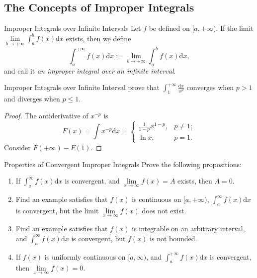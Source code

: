 \subsection{The Concepts of Improper Integrals}

\begin{definition}{Improper Integrals over Infinite Intervals}{}
  Let $f$ be defined on $[a, +\infty)$.
  If the limit $\lim \limits _{b \rightarrow +\infty} \int_a^b f(x)\mathrm{d} x$
  exists,
  then we define
  \begin{equation}
    \int_a^{+\infty} f(x) \mathrm{d} x := \lim \limits _{b \rightarrow +\infty} \int_a^b f(x)\mathrm{d} x,
  \end{equation}
  and call it \emph{an improper integral over an infinite interval}.
\end{definition}

\begin{example}{Improper Integrals over Infinite Interval}{}
  prove that $\int_1^{+\infty} \frac{\mathrm{d}x}{x^p}$ converges when $p > 1$
  and diverges when $p \leq 1$.
\end{example}

\begin{proof}
  The antiderivative of $x^{-p}$ is
  \begin{equation}
    F(x) = \int x^{-p}\mathrm{d} x =
    \begin{cases}
      \frac{1}{1-p} x^{1-p}, & p \neq 1;\\
      \ln x, & p =1.
    \end{cases}
  \end{equation}
  Consider $F(+\infty) - F(1)$.
\end{proof}

\begin{example}{Properties of Convergent Improper Integrals}{}
  Prove the following propositions:
  \begin{enumerate}
  \item If $\int_a^{\infty}f(x)\mathrm{d} x$ is convergent,
    and $\lim \limits _{x \rightarrow \infty}f(x) = A$ exists,
    then $A = 0$.
  \item Find an example satisfies that $f(x)$ is continuous on $[a, +\infty)$,
    $\int_a^{\infty}f(x)\mathrm{d} x$ is convergent,
    but the limit $\lim \limits _{x \rightarrow \infty}f(x)$ does not exist.
  \item Find an example satisfies that $f(x)$ is integrable on an arbitrary interval,
    and $\int_a^{\infty}f(x)\mathrm{d} x$ is convergent, but $f(x)$ is not bounded.
  \item If $f(x)$ is uniformly continuous on $[a, \infty)$,
    and $\int_a^{+\infty}f(x)\mathrm{d} x$ is convergent,
    then $\lim \limits _{x \rightarrow \infty}f(x) = 0$.
  \end{enumerate}
\end{example}

